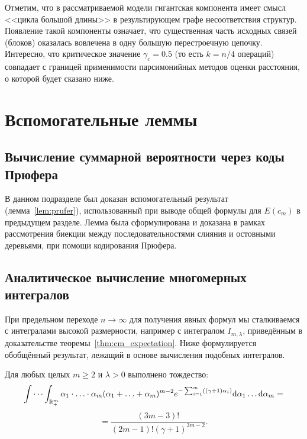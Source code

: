 Отметим, что в рассматриваемой модели гигантская компонента имеет смысл <<цикла большой длины>> в результирующем графе несоответствия структур. Появление такой компоненты означает, что существенная часть исходных связей (блоков) оказалась вовлечена в одну большую перестроечную цепочку. Интересно, что критическое значение $\gamma_c = 0.5$ (то есть $k = n/4$ операций) совпадает с границей применимости парсимонийных методов оценки расстояния, о которой будет сказано ниже.

\section{Вспомогательные леммы}

\subsection{Вычисление суммарной вероятности через коды Прюфера}

В данном подразделе был доказан вспомогательный результат (лемма~\ref{lem:prufer}), использованный при выводе общей формулы для $E(c_m)$ в предыдущем разделе. Лемма была сформулирована и доказана в рамках рассмотрения биекции между последовательностями слияния и остовными деревьями, при помощи кодирования Прюфера.

\subsection{Аналитическое вычисление многомерных интегралов}

При предельном переходе $n \to \infty$ для получения явных формул мы сталкиваемся с интегралами высокой размерности, например с интегралом $I_{m,\lambda}$, приведённым в доказательстве теоремы~\ref{thm:cm_expectation}. Ниже формулируется обобщённый результат, лежащий в основе вычисления подобных интегралов.

\begin{lemma}\label{lem:integral}
Для любых целых $m \ge 2$ и $\lambda > 0$ выполнено тождество:
$$
    \idotsint_{ \mathbb{R}^m_+} {
        \alpha_1 \cdot \ldots \cdot \alpha_m
        (\alpha_1 + \ldots + \alpha_m) ^ {m - 2}
        e ^ { -\sum_{i=1}^{m} ((\gamma + 1) \alpha_i)}
        \mathrm{d} \alpha_1 \ldots \mathrm{d} \alpha_m
    } = $$ $$ =  \frac
    {(3 m - 3)!}
    {(2 m - 1)! (\gamma + 1) ^ {3 m - 2}}
    \label{l-int}.
$$
\end{lemma}

